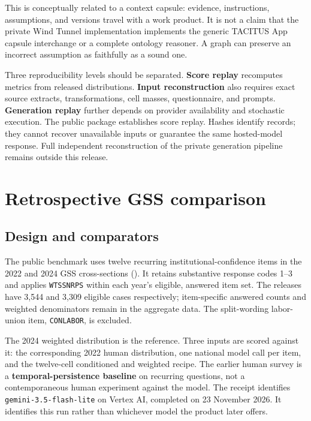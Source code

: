 \documentclass[
  11pt,
]{article}
\let\originalsection\section
\renewcommand{\section}{\Needspace{5\baselineskip}\originalsection}
\begin{document}
This is conceptually related to a context capsule: evidence,
instructions, assumptions, and versions travel with a work product. It
is not a claim that the private Wind Tunnel implementation implements
the generic TACITUS App capsule interchange or a complete ontology
reasoner. A graph can preserve an incorrect assumption as faithfully as
a sound one.

Three reproducibility levels should be separated. \textbf{Score replay}
recomputes metrics from released distributions. \textbf{Input
reconstruction} also requires exact source extracts, transformations,
cell masses, questionnaire, and prompts. \textbf{Generation replay}
further depends on provider availability and stochastic execution. The
public package establishes score replay. Hashes identify records; they
cannot recover unavailable inputs or guarantee the same hosted-model
response. Full independent reconstruction of the private generation
pipeline remains outside this release.

\section{Retrospective GSS
comparison}\label{retrospective-gss-comparison}

\subsection{Design and comparators}\label{design-and-comparators}

The public benchmark uses twelve recurring institutional-confidence
items in the 2022 and 2024 GSS cross-sections
(). It
retains substantive response codes 1--3 and applies \texttt{WTSSNRPS}
within each year's eligible, answered item set. The releases have 3,544
and 3,309 eligible cases respectively; item-specific answered counts and
weighted denominators remain in the aggregate data. The split-wording
labor-union item, \texttt{CONLABOR}, is excluded.

The 2024 weighted distribution is the reference. Three inputs are scored
against it: the corresponding 2022 human distribution, one national
model call per item, and the twelve-cell conditioned and weighted
recipe. The earlier human survey is a \textbf{temporal-persistence
baseline} on recurring questions, not a contemporaneous human experiment
against the model. The receipt identifies \texttt{gemini-3.5-flash-lite}
on Vertex AI, completed on 23 November 2026. It identifies this run
rather than whichever model the product later offers.
\end{document}
